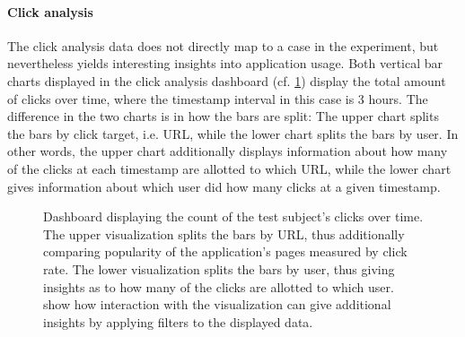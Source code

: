 \paragraph{Click analysis}

The click analysis data does not directly map to a case in the experiment, but nevertheless yields interesting insights into application usage.
Both vertical bar charts displayed in the click analysis dashboard (cf. \cref{figure:evaluation:user:dashboard-clicks}) display the total amount of clicks over time, where the timestamp interval in this case is 3 hours.
The difference in the two charts is in how the bars are split:
The upper chart splits the bars by click target, i.e. URL, while the lower chart splits the bars by user.
In other words, the upper chart additionally displays information about how many of the clicks at each timestamp are allotted to which URL, while the lower chart gives information about which user did how many clicks at a given timestamp.

\begin{figure}[h]
        \caption[Dashboard displaying the count of the test subject's clicks over time.]{
        Dashboard displaying the count of the test subject's clicks over time.
        The upper visualization splits the bars by URL, thus additionally comparing popularity of the application's pages measured by click rate.
        The lower visualization splits the bars by user, thus giving insights as to how many of the clicks are allotted to which user.
         show how interaction with the visualization can give additional insights by applying filters to the displayed data.
        }
        \label{figure:evaluation:user:dashboard-clicks}
\end{figure}

